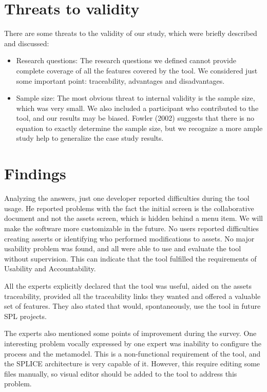 \section{Threats to validity}
\label{sc:threats}
There  are some  threats  to  the  validity of our  study,  which  were briefly described and discussed:


\begin{itemize}
\item Research  questions:  The  research  questions  we  defined  cannot provide  complete  coverage  of  all the features covered by the tool. We considered just some important point: traceability, advantages and disadvantages. 

\item Sample  size:  The  most  obvious  threat  to  internal  validity  is  the sample  size,  which  was very small. We also included a participant who contributed to the tool, and our results may be biased. Fowler  (2002)  suggests  that  there  is  no  equation  to  exactly determine the sample size, but we recognize a more ample study help to generalize the case study results.

\end{itemize}

\section{Findings}
\label{sc:leassonsLearned}


Analyzing the answers, just one developer reported difficulties during the tool usage. He reported problems with the fact the initial screen is the collaborative document and not the assets screen, which is hidden behind a menu item. We will make the software more customizable in the future. No users reported difficulties creating asserts or identifying who performed modifications to assets. No major usability problem was found, and all were able to use and evaluate the tool without supervision. This can indicate that the tool fulfilled the requirements of Usability and Accountability.

All the experts explicitly declared that the tool was useful, aided on the assets traceability, provided all the traceability links they wanted and offered a valuable set of features. They also stated that would, spontaneously, use the tool in future \ac{SPL} projects. 

The experts also mentioned some points of improvement during the survey. One interesting problem vocally expressed by one expert was inability to configure the process and the metamodel. This is a non-functional requirement of the tool, and the \ac{SPLICE} architecture is very capable of it. However, this require editing some files manually, so visual editor should be added to the tool to address this problem.


